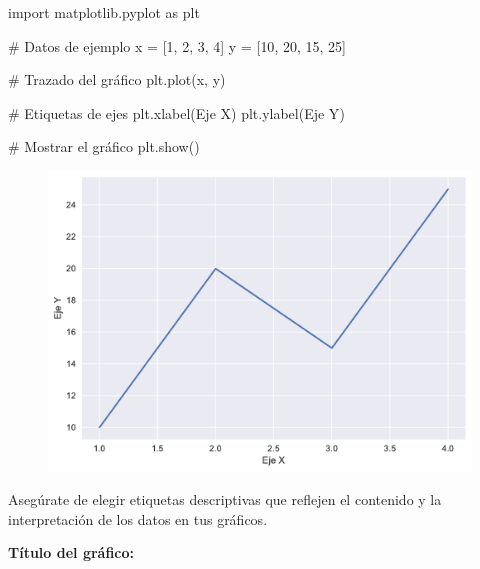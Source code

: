 \documentclass[
  a4paper,
]{article}
\newenvironment{Shaded}{}{}
\newcommand{\CommentTok}[1]{\textcolor[rgb]{0.42,0.45,0.49}{#1}}
\newcommand{\DecValTok}[1]{\textcolor[rgb]{0.00,0.36,0.77}{#1}}
\newcommand{\ImportTok}[1]{\textcolor[rgb]{0.01,0.18,0.38}{#1}}
\newcommand{\NormalTok}[1]{\textcolor[rgb]{0.14,0.16,0.18}{#1}}
\newcommand{\OperatorTok}[1]{\textcolor[rgb]{0.14,0.16,0.18}{#1}}
\newcommand{\StringTok}[1]{\textcolor[rgb]{0.01,0.18,0.38}{#1}}
\begin{document}
\begin{Shaded}
\begin{Highlighting}[]
\ImportTok{import}\NormalTok{ matplotlib.pyplot }\ImportTok{as}\NormalTok{ plt}

\CommentTok{\# Datos de ejemplo}
\NormalTok{x }\OperatorTok{=}\NormalTok{ [}\DecValTok{1}\NormalTok{, }\DecValTok{2}\NormalTok{, }\DecValTok{3}\NormalTok{, }\DecValTok{4}\NormalTok{]}
\NormalTok{y }\OperatorTok{=}\NormalTok{ [}\DecValTok{10}\NormalTok{, }\DecValTok{20}\NormalTok{, }\DecValTok{15}\NormalTok{, }\DecValTok{25}\NormalTok{]}

\CommentTok{\# Trazado del gráfico}
\NormalTok{plt.plot(x, y)}

\CommentTok{\# Etiquetas de ejes}
\NormalTok{plt.xlabel(}\StringTok{\textquotesingle{}Eje X\textquotesingle{}}\NormalTok{)}
\NormalTok{plt.ylabel(}\StringTok{\textquotesingle{}Eje Y\textquotesingle{}}\NormalTok{)}

\CommentTok{\# Mostrar el gráfico}
\NormalTok{plt.show()}
\end{Highlighting}
\end{Shaded}

\begin{figure}[H]

{\centering \includegraphics{index_files/figure-pdf/cell-9-output-1.pdf}

}

\end{figure}

Asegúrate de elegir etiquetas descriptivas que reflejen el contenido y
la interpretación de los datos en tus gráficos.

\textbf{Título del gráfico:}
\end{document}
